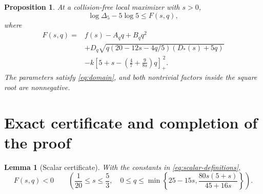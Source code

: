 \documentclass[11pt]{article}
\newtheorem{proposition}[theorem]{Proposition}
\newtheorem{lemma}[theorem]{Lemma}
\theoremstyle{remark}
\newcommand{\pos}[1]{[#1]_+}
\numberwithin{equation}{section}
\begin{document}
\begin{proposition}\label{prop:scalar}
At a collision-free local maximizer with $s>0$,
\begin{equation}\label{eq:F-bound}
 \log\Delta_5-5\log5\le F(s,q),
\end{equation}
where
\begin{equation}\label{eq:F}
\begin{aligned}
 F(s,q)={}&f(s)-A_q q+B_q q^2\\
 &+D_q\sqrt{q(20-12s-4q/5)(D_*(s)+5q)}\\
 &-k\pos{5+s-\left(\frac47+\frac9{8s}\right)q}^{\,2}.
\end{aligned}
\end{equation}
The parameters satisfy \eqref{eq:domain}, and both nontrivial factors
inside the square root are nonnegative.
\end{proposition}

\section{Exact certificate and completion of the proof}
\begin{lemma}[Scalar certificate]\label{lem:certificate}
With the constants in \eqref{eq:scalar-definitions},
\begin{equation}\label{eq:certificate}
 F(s,q)<0\qquad
 \left(\frac1{20}\le s\le\frac53,\quad
 0\le q\le\min\left\{25-15s,\frac{80s(5+s)}{45+16s}\right\}\right).
\end{equation}
\end{lemma}
\end{document}

